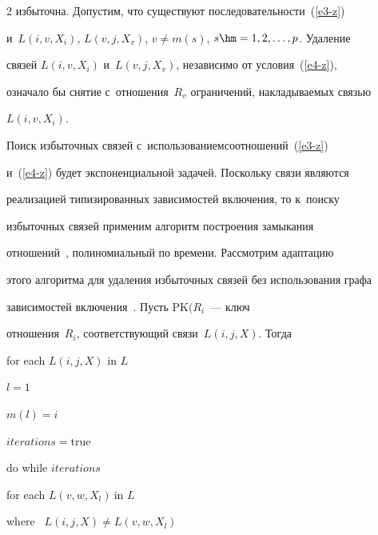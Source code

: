 \begin{multicols}{2}
избыточна. Допустим, что существуют последовательности~(\ref{e3-z})

и~$L(i,v,X_i)$, $L(v,j,X_v)$, $v\not= m(s)$, $s\hm= 1,2, \ldots, p$. Удаление

связей $L(i,v,X_i)$ и~$L(v,j,X_v)$, независимо от условия~(\ref{e4-z}),

означало бы снятие с~отношения~$R_v$ ограничений, накладываемых связью

$L(i,v,X_i)$.





  \smallskip



  Поиск избыточных связей с~использованием\linebreak соотношений~(\ref{e3-z})

и~(\ref{e4-z}) будет экспоненциальной задачей. Поскольку связи являются

реализацией типизированных зависимостей включения, то к~поиску

избыточных связей применим алгоритм по\-стро\-ения замыкания

отношений~\cite{2-z}, полиномиальный по времени. Рассмотрим адаптацию

этого алгоритма для удаления избыточных связей без использования графа

зависимостей включения~\cite{6-z}. Пусть $\mathrm{PK}(R_i$~--- ключ

отношения~$R_i$, соответст\-ву\-ющий связи~$L(i,j,X)$. Тогда



\noindent

for each $L(i,j,X)$ in $L$



\hspace*{2mm}$l=1$



\hspace*{2mm}$m(l)=i$



\hspace*{2mm}$iterations=\mathrm{true}$



\hspace*{2mm}do while $iterations$



\hspace*{3mm}for each $L(v,w,X_l)\ \mbox{in\ } L$



\hspace*{3mm}\mbox{where\ } $L(i,j,X)\not= L(v,w,X_l)$




\end{multicols}
